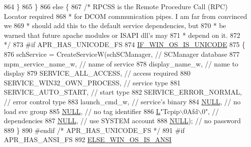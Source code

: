 \begin{DoxyCode}
{{{864         \}
865     \}
866     \textcolor{keywordflow}{else} \{
867         \textcolor{comment}{/* RPCSS is the Remote Procedure Call (RPC) Locator required}
868 \textcolor{comment}{         * for DCOM communication pipes.  I am far from convinced we}
869 \textcolor{comment}{         * should add this to the default service dependencies, but}
870 \textcolor{comment}{         * be warned that future apache modules or ISAPI dll's may}
871 \textcolor{comment}{         * depend on it.}
872 \textcolor{comment}{         */}
873 \textcolor{preprocessor}{#if APR\_HAS\_UNICODE\_FS}
874         \hyperlink{win32_2apr__arch__misc_8h_a8c631486790f65bd87ed0623a25bdd3d}{IF\_WIN\_OS\_IS\_UNICODE}
875         \{
876             schService = CreateServiceW(schSCManager,    \textcolor{comment}{// SCManager database}
877                                  mpm\_service\_name\_w,   \textcolor{comment}{// name of service}
878                                  display\_name\_w,   \textcolor{comment}{// name to display}
879                                  SERVICE\_ALL\_ACCESS,   \textcolor{comment}{// access required}
880                                  SERVICE\_WIN32\_OWN\_PROCESS,  \textcolor{comment}{// service type}
881                                  SERVICE\_AUTO\_START,   \textcolor{comment}{// start type}
882                                  SERVICE\_ERROR\_NORMAL, \textcolor{comment}{// error control type}
883                                  launch\_cmd\_w,         \textcolor{comment}{// service's binary}
884                                  \hyperlink{pcre_8txt_ad7f989d16aa8ca809a36bc392c07fba1}{NULL},                 \textcolor{comment}{// no load svc group}
885                                  \hyperlink{pcre_8txt_ad7f989d16aa8ca809a36bc392c07fba1}{NULL},                 \textcolor{comment}{// no tag identifier}
886                                  \hyperlink{mod__lua_8h_a62f94dfc0036bec0c14106c2f15caf3e}{L}\textcolor{stringliteral}{"Tcpip\(\backslash\)0Afd\(\backslash\)0"},      \textcolor{comment}{// dependencies}
887                                  \hyperlink{pcre_8txt_ad7f989d16aa8ca809a36bc392c07fba1}{NULL},                 \textcolor{comment}{// use SYSTEM account}
888                                  \hyperlink{pcre_8txt_ad7f989d16aa8ca809a36bc392c07fba1}{NULL});                \textcolor{comment}{// no password}
889         \}
890 \textcolor{preprocessor}{#endif }\textcolor{comment}{/* APR\_HAS\_UNICODE\_FS */}\textcolor{preprocessor}{}
891 \textcolor{preprocessor}{#if APR\_HAS\_ANSI\_FS}
892         \hyperlink{win32_2apr__arch__misc_8h_a2d1423da7a6a46da1276017c8140be22}{ELSE\_WIN\_OS\_IS\_ANSI}
}}}
\end{DoxyCode}
